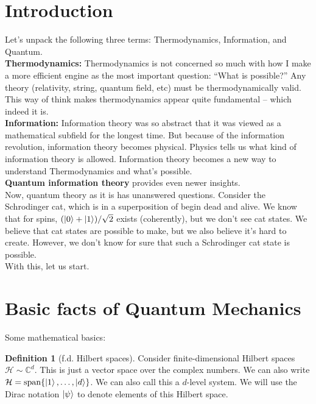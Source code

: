 \documentclass{book}
\theoremstyle{definition}
\newtheorem{defn}{Definition}[section]
\newcommand{\had}{\mathcal{H}}
\begin{document}
\newpage

\section{Introduction}


Let's unpack the following three terms: Thermodynamics, Information, and Quantum. \\

\noindent \textbf{Thermodynamics:} Thermodynamics is not concerned so much with how I make a more efficient engine as the most important question: ``What is possible?'' Any theory (relativity, string, quantum field, etc) must be thermodynamically valid. This way of think makes thermodynamics appear quite fundamental -- which indeed it is. \\

\noindent \textbf{Information:} Information theory was so abstract that it was viewed as a mathematical subfield for the longest time. But because of the information revolution, information theory becomes physical. Physics tells us what kind of information theory is allowed. Information theory becomes a new way to understand Thermodynamics and what's possible. \\

\noindent \textbf{Quantum information theory} provides even newer insights. \\




Now, quantum theory as it is has unanswered questions. Consider the Schrodinger cat, which is in a superposition of begin dead and alive. We know that for spins, $(\ket{0} + \ket{1})/\sqrt{2}$ exists (coherently), but we don't see cat states. We believe that cat states are possible to make, but we also believe it's hard to create. However, we don't know for sure that such a Schrodinger cat state is possible.  \\

With this, let us start. 

\newpage


\section{Basic facts of Quantum Mechanics}


Some mathematical basics: 
\begin{defn}[f.d. Hilbert spaces]
	Consider finite-dimensional Hilbert spaces $\had \sim \mathbb{C}^d$. This is just a vector space over the complex numbers. We can also write $\had = \text{span}\{ \ket{1},\dots, \ket{d}   \}$. We can also call this a $d$-level system. We will use the Dirac notation $\ket{\psi}$ to denote elements of this Hilbert space. 
\end{defn}
\end{document}
